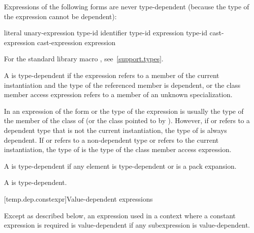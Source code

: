 \pnum
Expressions of the following forms are never type-dependent (because the type
of the expression cannot be dependent):

\begin{ncsimplebnf}
literal\br
{} unary-expression\br
{} \terminal{(} type-id \terminal{)}\br
{}  \terminal{(} identifier \terminal{)}\br
{} \terminal{(} type-id \terminal{)}\br
{} \terminal{(} expression \terminal{)}\br
{} \terminal{(} type-id \terminal{)}\br
\opt{\terminal{::}}  cast-expression\br
\opt{\terminal{::}}  \terminal{[} \terminal{]} cast-expression\br
{} \br
{} \terminal{(} expression \terminal{)}
\end{ncsimplebnf}

\begin{note}
For the standard library macro ,
see~\ref{support.types}.
\end{note}

\pnum
A  is
type-dependent if
the expression refers to a member of the current instantiation and
the type of the referenced member is dependent, or the class member access
expression refers to a member of an unknown specialization.
\begin{note}
In an expression of the form
or
the type of the expression is usually the type of the member
of the class of
(or the class pointed to by
).
However, if
or
refers to a dependent type that is not the current instantiation,
the type of
is always dependent. If
or 
refers to a non-dependent type or refers to the current instantiation, the
type of
is the type of the class member access expression.
\end{note}

\pnum
A  is type-dependent if any element is
type-dependent or is a pack expansion.

\pnum
A  is type-dependent.

[temp.dep.constexpr]{Value-dependent expressions}

\pnum
Except as described below, an expression used in a context where a
constant expression is required is value-dependent if any
subexpression is value-dependent.

